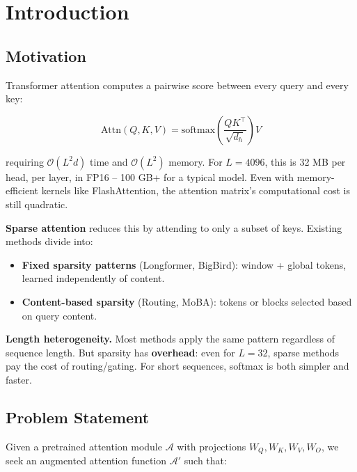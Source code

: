 \section{Introduction}

\subsection{Motivation}

Transformer attention computes a pairwise score between every query and 
every key:

\[
\text{Attn}(Q, K, V) = \text{softmax}\!\left(\frac{Q K^\top}{\sqrt{d_h}}\right) V
\tag{1.1}
\]

requiring $\mathcal{O}(L^2 d)$ time and $\mathcal{O}(L^2)$ memory. For 
$L = 4096$, this is 32 MB per head, per layer, in FP16 -- 100 GB+ for a 
typical model. Even with memory-efficient kernels like FlashAttention, the 
attention matrix's computational cost is still quadratic.

\textbf{Sparse attention} reduces this by attending to only a subset of keys. 
Existing methods divide into:

\begin{itemize}
\item \textbf{Fixed sparsity patterns} (Longformer, BigBird): window + global tokens,
  learned independently of content.
\item \textbf{Content-based sparsity} (Routing, MoBA): tokens or blocks selected
  based on query content.

\end{itemize}
\textbf{Length heterogeneity.} Most methods apply the same pattern regardless of 
sequence length. But sparsity has \textbf{overhead}: even for $L = 32$, sparse 
methods pay the cost of routing/gating. For short sequences, softmax is 
both simpler and faster.

\subsection{Problem Statement}

Given a pretrained attention module $\mathcal{A}$ with projections 
$W_Q, W_K, W_V, W_O$, we seek an augmented attention function 
$\mathcal{A}'$ such that:

